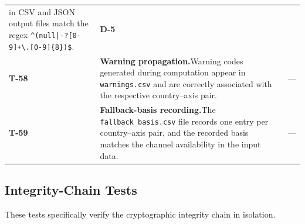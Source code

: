 \begin{longtable}{@{}l >{\raggedright\arraybackslash}p{5.5cm} l@{}}
    in CSV and JSON output files match the regex
    \texttt{\textasciicircum{}(null|-?[0-9]+\textbackslash.[0-9]\{8\})\$}. & \textbf{D-5} \\
  \textbf{T-58} & \textbf{Warning propagation.}\enspace  Warning codes
    generated during computation appear in \texttt{warnings.csv} and are
    correctly associated with the respective country--axis pair. & --- \\
  \textbf{T-59} & \textbf{Fallback-basis recording.}\enspace  The
    \texttt{fallback\_basis.csv} file records one entry per country--axis
    pair, and the recorded basis matches the channel availability in the
    input data. & --- \\
\end{longtable}

\subsection{Integrity-Chain Tests}\label{sec:test:integrity}

These tests specifically verify the cryptographic integrity chain in
isolation.

